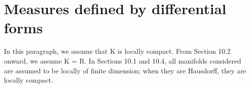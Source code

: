 \section{Measures defined by differential forms}

In this paragraph, we assume that K is locally compact. From Section 10.2 onward, we assume K = R. In Sections 10.1 and 10.4, all manifolds considered are assumed to be locally of finite dimension; when they are Hausdorff, they are locally compact.

